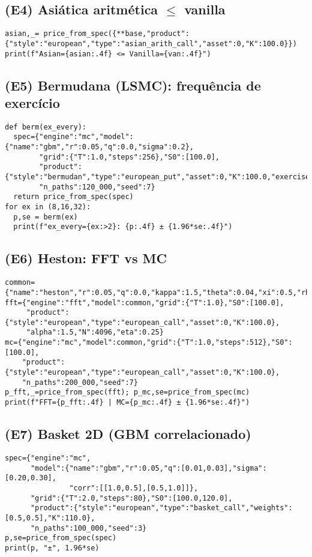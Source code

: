 \documentclass[11pt,a4paper]{article}
\begin{document}
\subsection{(E4) Asiática aritmética $\le$ vanilla}
\begin{lstlisting}[style=pystyle]
asian,_= price_from_spec({**base,"product":{"style":"european","type":"asian_arith_call","asset":0,"K":100.0}})
print(f"Asian={asian:.4f} <= Vanilla={van:.4f}")
\end{lstlisting}

\subsection{(E5) Bermudana (LSMC): frequência de exercício}
\begin{lstlisting}[style=pystyle]
def berm(ex_every):
  spec={"engine":"mc","model":{"name":"gbm","r":0.05,"q":0.0,"sigma":0.2},
        "grid":{"T":1.0,"steps":256},"S0":[100.0],
        "product":{"style":"bermudan","type":"european_put","asset":0,"K":100.0,"exercise_every":ex_every},
        "n_paths":120_000,"seed":7}
  return price_from_spec(spec)
for ex in (8,16,32):
  p,se = berm(ex)
  print(f"ex_every={ex:>2}: {p:.4f} ± {1.96*se:.4f}")
\end{lstlisting}

\subsection{(E6) Heston: FFT vs MC}
\begin{lstlisting}[style=pystyle]
common={"name":"heston","r":0.05,"q":0.0,"kappa":1.5,"theta":0.04,"xi":0.5,"rho":-0.7,"v0":0.04}
fft={"engine":"fft","model":common,"grid":{"T":1.0},"S0":[100.0],
     "product":{"style":"european","type":"european_call","asset":0,"K":100.0},
     "alpha":1.5,"N":4096,"eta":0.25}
mc={"engine":"mc","model":common,"grid":{"T":1.0,"steps":512},"S0":[100.0],
    "product":{"style":"european","type":"european_call","asset":0,"K":100.0},
    "n_paths":200_000,"seed":7}
p_fft,_=price_from_spec(fft); p_mc,se=price_from_spec(mc)
print(f"FFT={p_fft:.4f} | MC={p_mc:.4f} ± {1.96*se:.4f}")
\end{lstlisting}

\subsection{(E7) Basket 2D (GBM correlacionado)}
\begin{lstlisting}[style=pystyle]
spec={"engine":"mc",
      "model":{"name":"gbm","r":0.05,"q":[0.01,0.03],"sigma":[0.20,0.30],
               "corr":[[1.0,0.5],[0.5,1.0]]},
      "grid":{"T":2.0,"steps":80},"S0":[100.0,120.0],
      "product":{"style":"european","type":"basket_call","weights":[0.5,0.5],"K":110.0},
      "n_paths":100_000,"seed":3}
p,se=price_from_spec(spec)
print(p, "±", 1.96*se)
\end{lstlisting}
\end{document}
